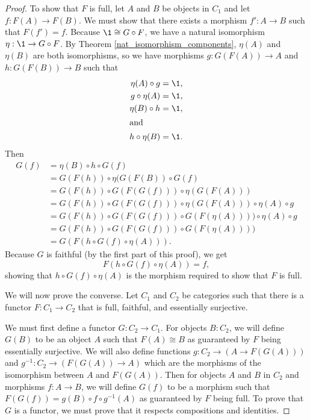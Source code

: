 \documentclass[../math.tex]{subfiles}
\begin{document}
\begin{proof}
    To show that $F$ is full, let $A$ and $B$ be objects in $C_1$ and let $f :
    F(A) \to F(B)$.  We must show that there exists a morphism $f' : A \to B$
    such that $F(f') = f$.  Because $\1 \cong G \circ F$, we have a natural
    isomorphism $\eta : \1 \to G \circ F$.  By Theorem
    \ref{nat_isomorphism_components}, $\eta(A)$ and $\eta(B)$ are both
    isomorphisms, so we have morphisms $g : G(F(A)) \to A$ and $h : G(F(B)) \to
    B$ such that
    \begin{align*}
        \eta(A) \circ g &= \1, \\
        g \circ \eta(A) &= \1, \\
        \eta(B) \circ h &= \1, \\
        \intertext{and}
        h \circ \eta(B) &= \1. \\
    \end{align*}
    Then
    \begin{align*}
        G(f) &= \eta(B) \circ h \circ G(f) \\
        &= G(F(h)) \circ \eta(G(F(B)) \circ G(f) \\
        &= G(F(h)) \circ G(F(G(f))) \circ \eta(G(F(A))) \\
        &= G(F(h)) \circ G(F(G(f))) \circ \eta(G(F(A))) \circ \eta(A) \circ g \\
        &= G(F(h)) \circ G(F(G(f))) \circ G(F(\eta(A)))) \circ \eta(A) \circ g \\
        &= G(F(h)) \circ G(F(G(f))) \circ G(F(\eta(A)))) \\
        &= G(F(h \circ G(f) \circ \eta(A))).
    \end{align*}
    Because $G$ is faithful (by the first part of this proof), we get
    \[
        F(h \circ G(f) \circ \eta(A)) = f,
    \]
    showing that $h \circ G(f) \circ \eta(A)$ is the morphism required to show
    that $F$ is full.

    We will now prove the converse.  Let $C_1$ and $C_2$ be categories such that
    there is a functor $F : C_1 \to C_2$ that is full, faithful, and essentially
    surjective.

    We must first define a functor $G : C_2 \to C_1$.  For objects $B : C_2$, we
    will define $G(B)$ to be an object $A$ such that $F(A) \cong B$ as
    guaranteed by $F$ being essentially surjective.  We will also define
    functions $g : C_2 \to (A \to F(G(A)))$ and $g^{-1} : C_2 \to (F(G(A)) \to
    A)$ which are the morphisms of the isomorphism between $A$ and $F(G(A))$.
    Then for objects $A$ and $B$ in $C_2$ and morphisms $f : A \to B$, we will
    define $G(f)$ to be a morphism such that $F(G(f)) = g(B) \circ f \circ
    g^{-1}(A)$ as guaranteed by $F$ being full.  To prove that $G$ is a functor,
    we must prove that it respects compositions and identities.


\end{proof}
\end{document}
